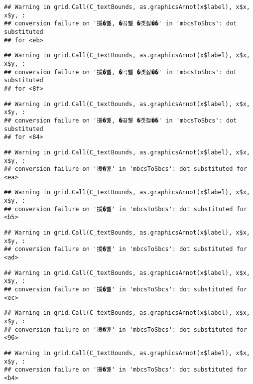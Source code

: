 \documentclass[
]{article}
\begin{document}
\begin{verbatim}
## Warning in grid.Call(C_textBounds, as.graphicsAnnot(x$label), x$x, x$y, :
## conversion failure on '援�뼱, �곸뼱 �곗젏��' in 'mbcsToSbcs': dot substituted
## for <eb>
\end{verbatim}

\begin{verbatim}
## Warning in grid.Call(C_textBounds, as.graphicsAnnot(x$label), x$x, x$y, :
## conversion failure on '援�뼱, �곸뼱 �곗젏��' in 'mbcsToSbcs': dot substituted
## for <8f>
\end{verbatim}

\begin{verbatim}
## Warning in grid.Call(C_textBounds, as.graphicsAnnot(x$label), x$x, x$y, :
## conversion failure on '援�뼱, �곸뼱 �곗젏��' in 'mbcsToSbcs': dot substituted
## for <84>
\end{verbatim}

\begin{verbatim}
## Warning in grid.Call(C_textBounds, as.graphicsAnnot(x$label), x$x, x$y, :
## conversion failure on '援�뼱' in 'mbcsToSbcs': dot substituted for <ea>
\end{verbatim}

\begin{verbatim}
## Warning in grid.Call(C_textBounds, as.graphicsAnnot(x$label), x$x, x$y, :
## conversion failure on '援�뼱' in 'mbcsToSbcs': dot substituted for <b5>
\end{verbatim}

\begin{verbatim}
## Warning in grid.Call(C_textBounds, as.graphicsAnnot(x$label), x$x, x$y, :
## conversion failure on '援�뼱' in 'mbcsToSbcs': dot substituted for <ad>
\end{verbatim}

\begin{verbatim}
## Warning in grid.Call(C_textBounds, as.graphicsAnnot(x$label), x$x, x$y, :
## conversion failure on '援�뼱' in 'mbcsToSbcs': dot substituted for <ec>
\end{verbatim}

\begin{verbatim}
## Warning in grid.Call(C_textBounds, as.graphicsAnnot(x$label), x$x, x$y, :
## conversion failure on '援�뼱' in 'mbcsToSbcs': dot substituted for <96>
\end{verbatim}

\begin{verbatim}
## Warning in grid.Call(C_textBounds, as.graphicsAnnot(x$label), x$x, x$y, :
## conversion failure on '援�뼱' in 'mbcsToSbcs': dot substituted for <b4>
\end{verbatim}
\end{document}
